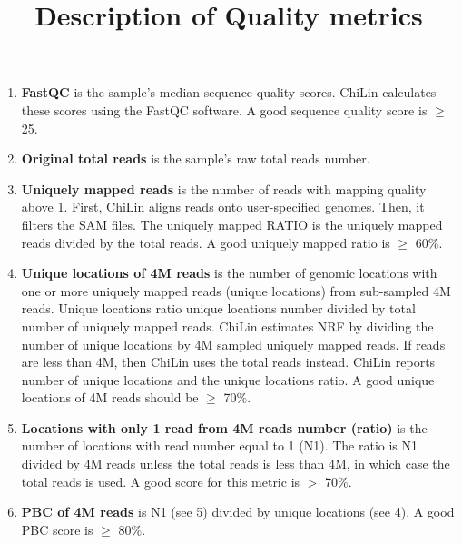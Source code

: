 \documentclass[9pt]{article}
\title{Description of Quality metrics}
\begin{document}
\maketitle


\begin{enumerate}
\item{\textbf{FastQC} is the sample's median sequence quality scores. ChiLin calculates these scores using the FastQC software\cite{FastQC}. A good sequence quality score is $\geq$ 25.}
\item{\textbf{Original total reads} is the sample's raw total reads number.}
\item{\textbf{Uniquely mapped reads} is the number of reads with mapping quality above 1. First, ChiLin aligns reads onto user-specified genomes. Then, it filters the SAM files. The uniquely mapped RATIO is the uniquely mapped reads divided by the total reads. A good uniquely mapped ratio is $\geq$ 60$\%$}.
\item{\textbf{Unique locations of 4M reads} is the number of genomic locations with one or more uniquely mapped reads (unique locations) from sub-sampled 4M reads. Unique locations ratio unique locations number divided by total number of uniquely mapped reads. ChiLin estimates NRF by dividing the number of unique locations by 4M sampled uniquely mapped reads. If reads are less than 4M, then ChiLin uses the total reads instead. ChiLin reports number of unique locations and the unique locations ratio. A good unique locations of 4M reads should be $\geq$ 70$\%$. }
\item{\textbf{Locations with only 1 read from 4M reads number (ratio)} is the number of locations with read number equal to 1 (N1). The ratio is N1 divided by 4M reads unless the total reads is less than 4M, in which case the total reads is used. A good score for this metric is $>$ 70$\%$.}
\item{\textbf{PBC of 4M reads} is N1 (see 5) divided by unique locations (see 4). A good PBC score is $\geq$ 80$\%$.}
  

\end{enumerate}
\end{document}
